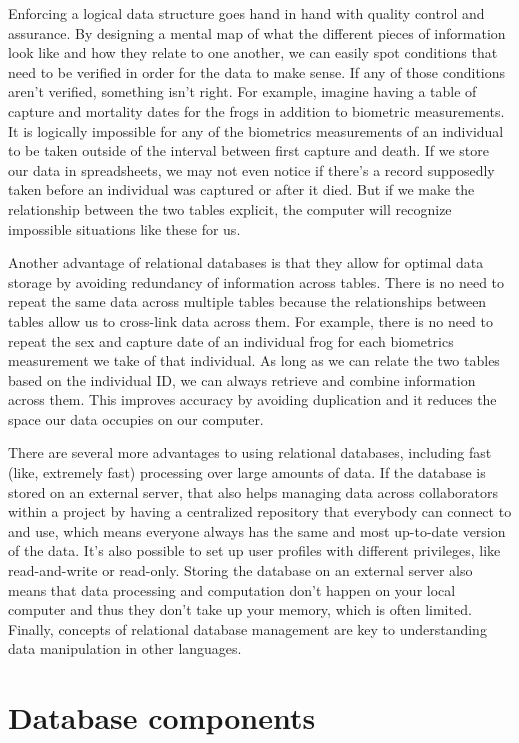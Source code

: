 \documentclass[
]{book}
\begin{document}
Enforcing a logical data structure goes hand in hand with quality control and assurance. By designing a mental map of what the different pieces of information look like and how they relate to one another, we can easily spot conditions that need to be verified in order for the data to make sense. If any of those conditions aren't verified, something isn't right. For example, imagine having a table of capture and mortality dates for the frogs in addition to biometric measurements. It is logically impossible for any of the biometrics measurements of an individual to be taken outside of the interval between first capture and death. If we store our data in spreadsheets, we may not even notice if there's a record supposedly taken before an individual was captured or after it died. But if we make the relationship between the two tables explicit, the computer will recognize impossible situations like these for us.

Another advantage of relational databases is that they allow for optimal data storage by avoiding redundancy of information across tables. There is no need to repeat the same data across multiple tables because the relationships between tables allow us to cross-link data across them. For example, there is no need to repeat the sex and capture date of an individual frog for each biometrics measurement we take of that individual. As long as we can relate the two tables based on the individual ID, we can always retrieve and combine information across them. This improves accuracy by avoiding duplication and it reduces the space our data occupies on our computer.

There are several more advantages to using relational databases, including fast (like, extremely fast) processing over large amounts of data. If the database is stored on an external server, that also helps managing data across collaborators within a project by having a centralized repository that everybody can connect to and use, which means everyone always has the same and most up-to-date version of the data. It's also possible to set up user profiles with different privileges, like read-and-write or read-only. Storing the database on an external server also means that data processing and computation don't happen on your local computer and thus they don't take up your memory, which is often limited. Finally, concepts of relational database management are key to understanding data manipulation in other languages.

\hypertarget{database-components}{%
\section{Database components}\label{database-components}}
\end{document}
